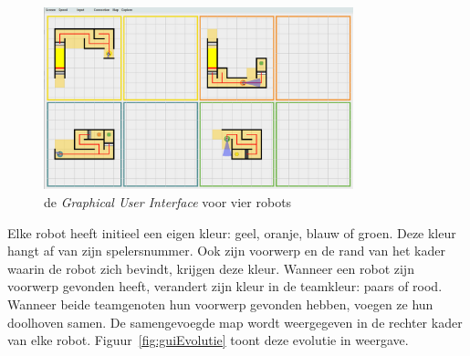 \documentclass[eind]{penoverslag}
\begin{document}
\begin{figure}[h]
\centering
	\includegraphics[width=0.8\textwidth]{gui4Robots}
\caption{de \textit{Graphical User Interface} voor vier robots}
\label{fig:gui4}
\end{figure}

Elke robot heeft initieel een eigen kleur: geel, oranje, blauw of groen. Deze kleur hangt af van zijn spelersnummer. Ook zijn voorwerp en de rand van het kader waarin de robot zich bevindt, krijgen deze kleur. Wanneer een robot zijn voorwerp gevonden heeft, verandert zijn kleur in de teamkleur: paars of rood. Wanneer beide teamgenoten hun voorwerp gevonden hebben, voegen ze hun doolhoven samen. De samengevoegde map wordt weergegeven in de rechter kader van elke robot. Figuur~\ref{fig:guiEvolutie} toont deze evolutie in weergave.\\
\end{document}
